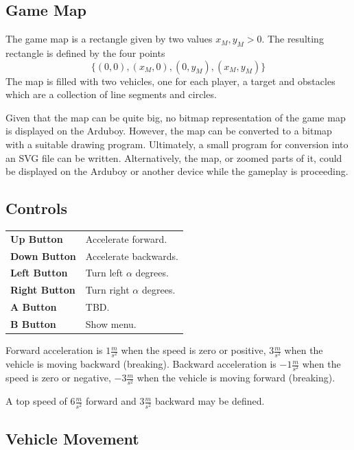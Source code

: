 \documentclass[11pt]{article}
\newcommand{\mssq}{\frac{m}{s^2}}
\begin{document}
\subsection{Game Map}
\label{sec-game-map}
The game map is a rectangle given by two values $x_M, y_M > 0$. The resulting
rectangle is defined by the four points
\begin{equation*}
    \{(0,0), (x_M, 0), (0, y_M), (x_M, y_M)\}
\end{equation*}
The map is filled with two vehicles, one for each player, a target and
obstacles which are a collection of line segments and circles.

Given that the map can be quite big, no bitmap representation of the game map
is displayed on the Arduboy. However, the map can be converted to a bitmap
with a suitable drawing program. Ultimately, a small program for conversion
into an SVG file can be written. Alternatively, the map, or zoomed parts of it,
could be displayed on the Arduboy or another device while the gameplay is
proceeding.

\subsection{Controls}
\label{sec-controls}

\begin{tabular}{>{\sffamily\bfseries}ll}
    Up Button & Accelerate forward. \\
    Down Button & Accelerate backwards.\\
    Left Button & Turn left $\alpha$ degrees.\\
    Right Button & Turn right $\alpha$ degrees.\\
    A Button & TBD.\\
    B Button & Show menu.\\
\end{tabular}

Forward acceleration is $1\mssq$ when the speed is zero or positive,
$3\mssq$ when the vehicle is moving backward (breaking).
Backward acceleration is $-1\mssq$ when the speed is zero or negative,
$-3\mssq$ when the vehicle is moving forward (breaking).

A top speed of $6\mssq$ forward and $3\mssq$ backward may be defined.

\subsection{Vehicle Movement}
\label{sec-vehicle-movement}
\end{document}
